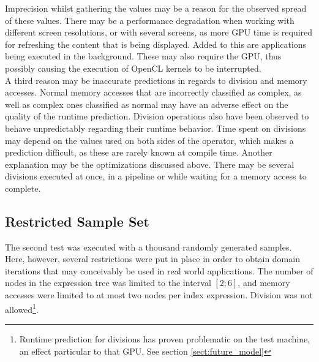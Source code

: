 Imprecision whilst gathering the values may be a reason for the observed spread of these values. There may be a performance degradation when working with different screen resolutions, or with several screens, as more GPU time is required for refreshing the content that is being displayed. Added to this are applications being executed in the background. These may also require the GPU, thus possibly causing the execution of OpenCL kernels to be interrupted. \\

A third reason may be inaccurate predictions in regards to division and memory accesses. Normal memory accesses that are incorrectly classified as complex, as well as complex ones classified as normal may have an adverse effect on the quality of the runtime prediction. Division operations also have been observed to behave unpredictably regarding their runtime behavior. Time spent on divisions may depend on the values used on both sides of the operator, which makes a prediction difficult, as these are rarely known at compile time. Another explanation may be the optimizations discussed above. There may be several divisions executed at once, in a pipeline or while waiting for a memory access to complete. \\


\subsection{Restricted Sample Set}
\label{sect:results_evaluation_restricted}
The second test was executed with a thousand randomly generated samples. Here, however, several restrictions were put in place in order to obtain domain iterations that may conceivably be used in real world applications. The number of nodes in the expression tree was limited to the interval $[2;6]$, and memory accesses were limited to at most two nodes per index expression. Division was not allowed\footnote{Runtime prediction for divisions has proven problematic on the test machine, an effect particular to that GPU. See section \ref{sect:future_model}}. \\

